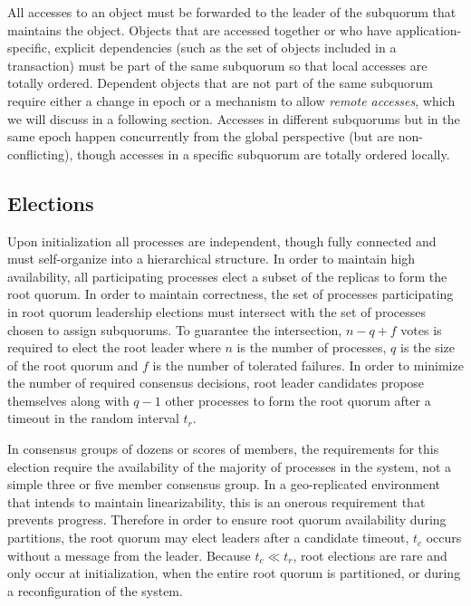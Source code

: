 \documentclass[sigconf]{acmart}
\begin{document}
All accesses to an object must be forwarded to the leader of the subquorum that maintains
the object.
Objects that are accessed together or who have application-specific, explicit
dependencies (such as the set of objects included in a transaction) must be part of the
same subquorum so that local accesses are totally ordered.
Dependent objects that are not part of the same subquorum require either a change in
epoch or a mechanism to allow \emph{remote accesses}, which we will discuss in a
following section.
Accesses in different subquorums but in the same epoch happen concurrently
from the global perspective (but are non-conflicting), though accesses in a
specific subquorum are totally ordered locally.

\subsection{Elections}

Upon initialization all processes are independent, though fully connected and must
self-organize into a hierarchical structure.
In order to maintain high availability, all participating processes elect a subset of the
replicas to form the root quorum.
In order to maintain correctness, the set of processes participating in root quorum
leadership elections must intersect with the set of processes chosen to assign
subquorums.
To guarantee the intersection, $n - q + f$ votes is required to elect the root leader
where $n$ is the number of processes, $q$ is the size of the root quorum and $f$ is the
number of tolerated failures.
In order to minimize the number of required consensus decisions, root leader candidates
propose themselves along with $q-1$ other processes to form the root quorum after a
timeout in the random interval $t_r$.

In consensus groups of dozens or scores of members, the requirements for this election
require the availability of the majority of processes in the system, not a simple three
or five member consensus group.
In a geo-replicated environment that intends to maintain linearizability, this is an
onerous requirement that prevents progress.
Therefore in order to ensure root quorum availability during partitions, the root quorum
may elect leaders after a candidate timeout, $t_c$ occurs without a message from the
leader.
Because $t_c \ll t_r$, root elections are rare and only occur at initialization, when the
entire root quorum is partitioned, or during a reconfiguration of the system.
\end{document}
